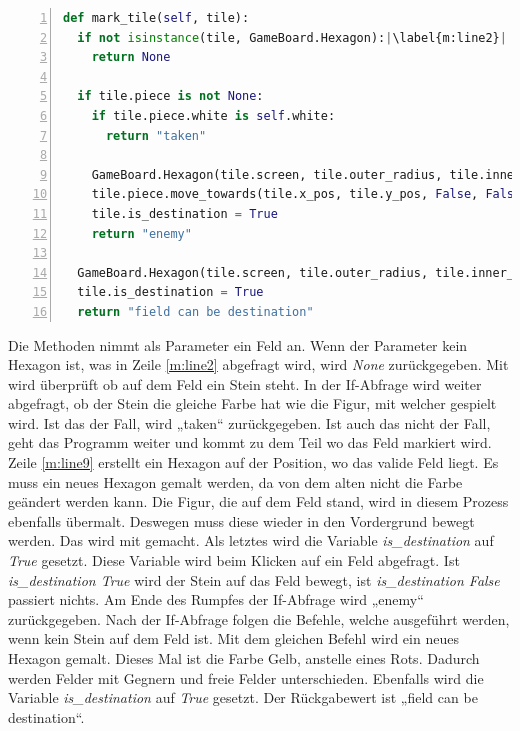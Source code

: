 \begin{lstlisting}[language=python,caption={Felder markieren},captionpos=b,label={lst:hexa:markieren},numbers=left,frame=none,escapechar=|]
def mark_tile(self, tile):
  if not isinstance(tile, GameBoard.Hexagon):|\label{m:line2}|
    return None

  if tile.piece is not None:
    if tile.piece.white is self.white:
      return "taken"

    GameBoard.Hexagon(tile.screen, tile.outer_radius, tile.inner_radius,tile.x_pos, tile.y_pos, (255, 0, 0))|\label{m:line9}|
    tile.piece.move_towards(tile.x_pos, tile.y_pos, False, False)
    tile.is_destination = True
    return "enemy"
  
  GameBoard.Hexagon(tile.screen, tile.outer_radius, tile.inner_radius, tile.x_pos, tile.y_pos, (249, 215, 28))
  tile.is_destination = True
  return "field can be destination"
\end{lstlisting}

Die Methoden nimmt als Parameter ein Feld an. Wenn der Parameter kein Hexagon ist, was in Zeile \ref{m:line2} abgefragt wird, wird \textit{None} zurückgegeben. Mit  wird überprüft ob auf dem Feld ein Stein steht. In der If-Abfrage wird weiter abgefragt, ob der Stein die gleiche Farbe hat wie die Figur, mit welcher gespielt wird. Ist das der Fall, wird „taken“ zurückgegeben. Ist auch das nicht der Fall, geht das Programm weiter und kommt zu dem Teil wo das Feld markiert wird. Zeile \ref{m:line9} erstellt ein Hexagon auf der Position, wo das valide Feld liegt. Es muss ein neues Hexagon gemalt werden, da von dem alten nicht die Farbe geändert werden kann. Die Figur, die auf dem Feld stand, wird in diesem Prozess ebenfalls übermalt. Deswegen muss diese wieder in den Vordergrund bewegt werden. Das wird mit  gemacht. Als letztes wird die Variable \textit{is\_destination} auf \textit{True} gesetzt. Diese Variable wird beim Klicken auf ein Feld abgefragt. Ist \textit{is\_destination True} wird der Stein auf das Feld bewegt, ist \textit{is\_destination False} passiert nichts. Am Ende des Rumpfes der If-Abfrage wird „enemy“ zurückgegeben. Nach der If-Abfrage folgen die Befehle, welche ausgeführt werden, wenn kein Stein auf dem Feld ist. Mit dem gleichen Befehl wird ein neues Hexagon gemalt. Dieses Mal ist die Farbe Gelb, anstelle eines Rots. Dadurch werden Felder mit Gegnern und freie Felder unterschieden. Ebenfalls wird die Variable \textit{is\_destination} auf \textit{True} gesetzt. Der Rückgabewert ist „field can be destination“.

